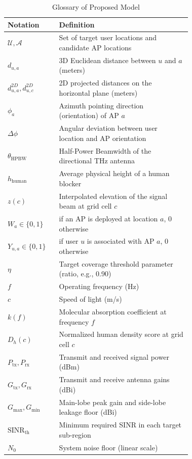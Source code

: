 \documentclass[conference]{IEEEtran}
\begin{document}
\begin{table}[htbp]
  \centering
  \caption{Glossary of Proposed Model}
  \label{tab:notations}

  \begin{tabular}{@{} l >{\raggedright\arraybackslash}p{0.72\linewidth} @{}}
    \toprule
    \textbf{Notation} & \textbf{Definition} \\
    \midrule
    $\mathcal{U}, \mathcal{A}$ & Set of target user locations and candidate AP locations \\
    $d_{u,a}$ & 3D Euclidean distance between $u$ and $a$ (meters) \\
    $d_{u,a}^{2D}, d_{u,c}^{2D}$ & 2D projected distances on the horizontal plane (meters) \\
    $\phi_a$ & Azimuth pointing direction (orientation) of AP $a$ \\
    $\Delta\phi$ & Angular deviation between user location and AP orientation \\
    $\theta_{\text{HPBW}}$ & Half-Power Beamwidth of the directional THz antenna \\
    $h_{\text{human}}$ & Average physical height of a human blocker  \\
    $z(c)$ & Interpolated elevation of the signal beam at grid cell $c$ \\
    $W_a \in \{0,1\}$ & 1 if an AP is deployed at location $a$, 0 otherwise \\
    $Y_{u,a} \in \{0,1\}$ & 1 if user $u$ is associated with AP $a$, 0 otherwise \\
    $\eta$ & Target coverage threshold parameter (ratio, e.g., 0.90) \\
    $f$ & Operating frequency (Hz) \\
    $c$ & Speed of light (m/s) \\
    $k(f)$ & Molecular absorption coefficient at frequency $f$ \\
    $D_h(c)$ & Normalized human density score at grid cell $c$ \\
    $P_{\text{tx}}, P_{\text{rx}}$ & Transmit and received signal power (dBm) \\
    $G_{\text{tx}}, G_{\text{rx}}$ & Transmit and receive antenna gains (dBi) \\
    $G_{\text{max}}, G_{\text{min}}$ & Main-lobe peak gain and side-lobe leakage floor (dBi) \\
    $\text{SINR}_{\text{th}}$ & Minimum required SINR in each target sub-region \\
    $N_0$ & System noise floor (linear scale) \\

\end{tabular}
\end{table}
\end{document}
